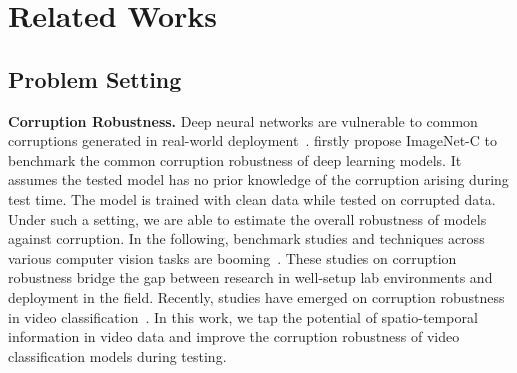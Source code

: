 \documentclass{article} %
\begin{document}
\section{Related Works}

\subsection{Problem Setting}


\textbf{Corruption Robustness.} 
Deep neural networks are vulnerable to common corruptions generated in real-world deployment~\citep{geirhos2017comparing,hendrycks2019benchmarking}. 
\cite{hendrycks2019benchmarking} firstly propose ImageNet-C to benchmark the common corruption robustness of deep learning models. 
It assumes the tested model has no prior knowledge of the corruption arising during test time. 
The model is trained with clean data while tested on corrupted data. 
Under such a setting, we are able to estimate the overall robustness of models against corruption. 
In the following, benchmark studies and techniques across various computer vision tasks are booming~\citep{kar20223d,michaelis2019benchmarking,kamann2020benchmarking}. 
These studies on corruption robustness bridge the gap between research in well-setup lab environments and deployment in the field. 
Recently, studies have emerged on corruption robustness in video classification~\citep{yi2021benchmarking,Wu_2020_CVPR}.
In this work, we tap the potential of spatio-temporal information in video data and improve the corruption robustness of video classification models during testing.
\end{document}
